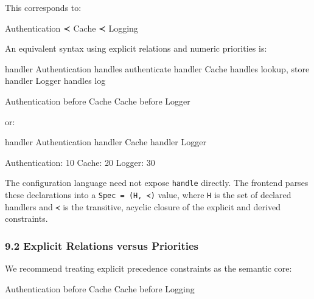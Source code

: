\documentclass[
  11pt,
]{article}
\newenvironment{Shaded}{}{}
\newcommand{\NormalTok}[1]{#1}
\begin{document}
This corresponds to:

\begin{Shaded}
\begin{Highlighting}[]
\NormalTok{Authentication ≺ Cache ≺ Logging}
\end{Highlighting}
\end{Shaded}

An equivalent syntax using explicit relations and numeric priorities is:

\begin{Shaded}
\begin{Highlighting}[]
\NormalTok{handler Authentication handles authenticate}
\NormalTok{handler Cache handles lookup, store}
\NormalTok{handler Logger handles log}

\NormalTok{Authentication before Cache}
\NormalTok{Cache before Logger}
\end{Highlighting}
\end{Shaded}

or:

\begin{Shaded}
\begin{Highlighting}[]
\NormalTok{handler Authentication}
\NormalTok{handler Cache}
\NormalTok{handler Logger}

\NormalTok{Authentication: 10}
\NormalTok{Cache: 20}
\NormalTok{Logger: 30}
\end{Highlighting}
\end{Shaded}

The configuration language need not expose \texttt{handle} directly. The
frontend parses these declarations into a \texttt{Spec\ =\ (H,\ ≺)}
value, where \texttt{H} is the set of declared handlers and \texttt{≺}
is the transitive, acyclic closure of the explicit and derived
constraints.

\subsubsection{9.2 Explicit Relations versus
Priorities}\label{explicit-relations-versus-priorities}

We recommend treating explicit precedence constraints as the semantic
core:

\begin{Shaded}
\begin{Highlighting}[]
\NormalTok{Authentication before Cache}
\NormalTok{Cache before Logging}
\end{Highlighting}
\end{Shaded}
\end{document}
